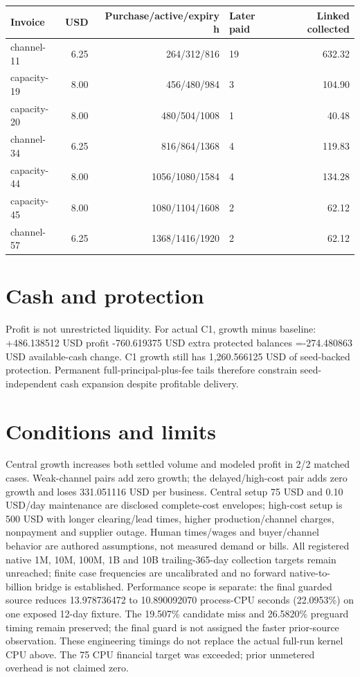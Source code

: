 \documentclass[10pt,letterpaper]{article}
\begin{document}
\par\noindent\begin{tabularx}{\linewidth}{@{}lrrXr@{}}\toprule Invoice & USD & Purchase/active/expiry h & Later paid & Linked collected \\ \midrule
channel-11 & 6.25 & 264/312/816 & 19 & 632.32 \\
capacity-19 & 8.00 & 456/480/984 & 3 & 104.90 \\
capacity-20 & 8.00 & 480/504/1008 & 1 & 40.48 \\
channel-34 & 6.25 & 816/864/1368 & 4 & 119.83 \\
capacity-44 & 8.00 & 1056/1080/1584 & 4 & 134.28 \\
capacity-45 & 8.00 & 1080/1104/1608 & 2 & 62.12 \\
channel-57 & 6.25 & 1368/1416/1920 & 2 & 62.12 \\\bottomrule\end{tabularx}\par
\normalsize
\section*{Cash and protection}
Profit is not unrestricted liquidity. For actual C1, growth minus baseline: +486.138512 USD profit -760.619375 USD extra protected balances =-274.480863 USD available-cash change. C1 growth still has 1,260.566125 USD of seed-backed protection. Permanent full-principal-plus-fee tails therefore constrain seed-independent cash expansion despite profitable delivery.
\section*{Conditions and limits}
Central growth increases both settled volume and modeled profit in 2/2 matched cases. Weak-channel pairs add zero growth; the delayed/high-cost pair adds zero growth and loses 331.051116 USD per business. Central setup 75 USD and 0.10 USD/day maintenance are disclosed complete-cost envelopes; high-cost setup is 500 USD with longer clearing/lead times, higher production/channel charges, nonpayment and supplier outage. Human times/wages and buyer/channel behavior are authored assumptions, not measured demand or bills. All registered native 1M, 10M, 100M, 1B and 10B trailing-365-day collection targets remain unreached; finite case frequencies are uncalibrated and no forward native-to-billion bridge is established.
\small Performance scope is separate: the final guarded source reduces 13.978736472 to 10.890092070 process-CPU seconds (22.0953\%) on one exposed 12-day fixture. The 19.507\% candidate miss and 26.5820\% preguard timing remain preserved; the final guard is not assigned the faster prior-source observation. These engineering timings do not replace the actual full-run kernel CPU above. The 75 CPU financial target was exceeded; prior unmetered overhead is not claimed zero.\normalsize
\end{document}
